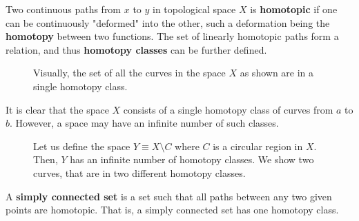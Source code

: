   \begin{definition}[Homotopy]
    Two continuous paths from $x$ to $y$ in topological space $X$ is \textbf{homotopic} if one can be continuously "deformed" into the other, such a deformation being the \textbf{homotopy} between two functions. The set of linearly homotopic paths form a relation, and thus \textbf{homotopy classes} can be further defined. 
    \begin{figure}[H]
      \centering 
      \caption{Visually, the set of all the curves in the space $X$ as shown are in a single homotopy class.} 
      \label{fig:single_homotopy_class}
    \end{figure}
  \end{definition}

  It is clear that the space $X$ consists of a single homotopy class of curves from $a$ to $b$. However, a space may have an infinite number of such classes. 

  \begin{figure}[H]
    \centering 
    \caption{Let us define the space $Y \equiv X \setminus C$ where $C$ is a circular region in $X$. Then, $Y$ has an infinite number of homotopy classes. We show two curves, that are in two different homotopy classes. }
    \label{fig:homotopy_class}
  \end{figure}

  \begin{definition}
    A \textbf{simply connected set} is a set such that all paths between any two given points are homotopic. That is, a simply connected set has one homotopy class. 
  \end{definition}


